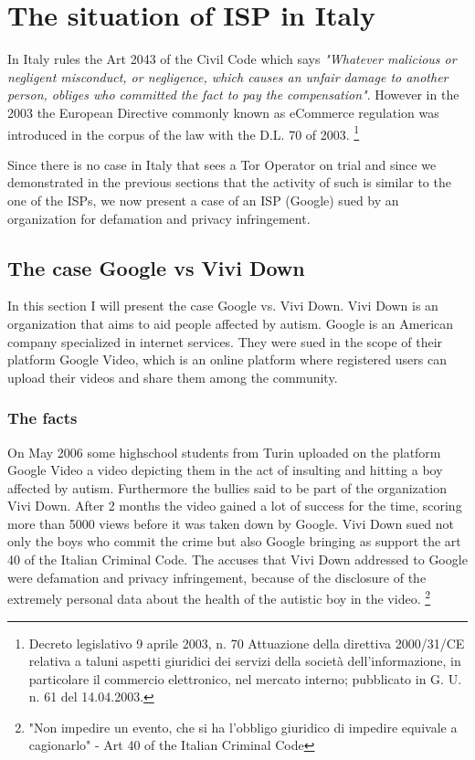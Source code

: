 \documentclass[runningheads,a4paper]{llncs}
\begin{document}
\section{The situation of ISP in Italy}\label{in_italy}

In Italy rules the Art 2043 of the Civil Code which says \textit{"Whatever malicious or negligent misconduct, or negligence, which causes an unfair damage to another person, obliges who committed the fact to pay the compensation"}. 
However in the 2003 the European Directive commonly known as eCommerce regulation was introduced in the corpus of the law with the D.L. 70 of 2003.
\footnote{Decreto legislativo 9 aprile 2003, n. 70 Attuazione della direttiva 2000/31/CE relativa a taluni aspetti giuridici dei servizi della società dell'informazione, in particolare il commercio elettronico, nel
mercato interno; pubblicato in G. U. n. 61 del 14.04.2003.
}

Since there is no case in Italy that sees a Tor Operator on trial and since we demonstrated in the previous sections that the activity of such is similar to the one of the ISPs, we now present a case of an ISP (Google) sued by an organization for defamation and privacy infringement.

\subsection{The case Google vs Vivi Down}
In this section I will present the case Google vs. Vivi Down.
Vivi Down is an organization that aims to aid people affected by autism.
Google is an American company specialized in internet services. They were sued in the scope of their platform Google Video, 
which is an online platform where registered users can upload their videos and share them among the community. 
\subsubsection{The facts}
On May 2006 some highschool students from Turin uploaded on the platform Google Video a video depicting them in the act of insulting and hitting a boy affected by autism. Furthermore the bullies said to be part of the organization Vivi Down. After 2 months the video gained a lot of success for the time, scoring more than 5000 views before it was taken down by Google. 
Vivi Down sued not only the boys who commit the crime but also Google bringing as support the art 40 of the Italian Criminal Code.
The accuses that Vivi Down addressed to Google were defamation and privacy infringement, because of the disclosure of the extremely personal data about the health of the autistic boy in the video.
\footnote{"Non impedire un evento, che si ha l'obbligo giuridico di impedire equivale a cagionarlo" - Art 40 of the Italian Criminal Code}
\end{document}
